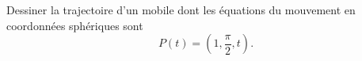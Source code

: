 
\begin{exercice}\label{exoOutilsMath-0009}

	Dessiner la trajectoire d'un mobile dont les équations du mouvement en coordonnées sphériques sont
	\begin{equation}
		P(t)=(1,\frac{ \pi }{2},t).
	\end{equation}

\end{exercice}
